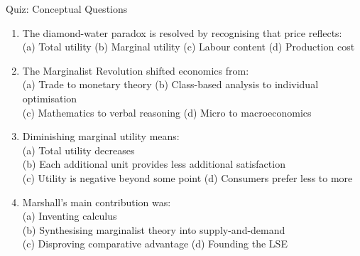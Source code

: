 \documentclass[aspectratio=169, 10pt]{beamer}
\begin{document}
\begin{frame}{Quiz: Conceptual Questions}
\begin{enumerate}
  \item The diamond-water paradox is resolved by recognising that price reflects:\\
        (a) Total utility \quad (b) \alert{Marginal utility} \quad
        (c) Labour content \quad (d) Production cost
  \vspace{0.3em}
  \item The Marginalist Revolution shifted economics from:\\
        (a) Trade to monetary theory \quad
        (b) \alert{Class-based analysis to individual optimisation}\\
        (c) Mathematics to verbal reasoning \quad
        (d) Micro to macroeconomics
  \vspace{0.3em}
  \item Diminishing marginal utility means:\\
        (a) Total utility decreases \\
        (b) \alert{Each additional unit provides less additional satisfaction}\\
        (c) Utility is negative beyond some point \quad
        (d) Consumers prefer less to more
  \vspace{0.3em}
  \item Marshall's main contribution was:\\
        (a) Inventing calculus\\
        (b) \alert{Synthesising marginalist theory into supply-and-demand}\\
        (c) Disproving comparative advantage \quad
        (d) Founding the LSE
\end{enumerate}
\end{frame}
\end{document}
